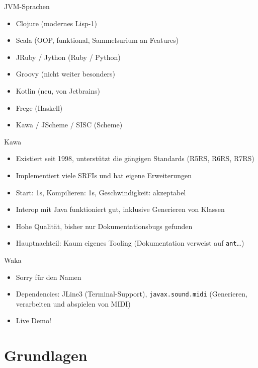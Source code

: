 \documentclass[presentation]{beamer}
\begin{document}
\begin{frame}[label=sec-1-7]{JVM-Sprachen}
\begin{itemize}
\item Clojure (modernes Lisp-1)
\item Scala (OOP, funktional, Sammelsurium an Features)
\item JRuby / Jython (Ruby / Python)
\item Groovy (nicht weiter besonders)
\item Kotlin (neu, von Jetbrains)
\item Frege (Haskell)
\item Kawa / JScheme / SISC (Scheme)
\end{itemize}
\end{frame}

\begin{frame}[fragile,label=sec-1-8]{Kawa}
 \begin{itemize}
\item Existiert seit 1998, unterstützt die gängigen Standards (R5RS, R6RS,
R7RS)
\item Implementiert viele SRFIs und hat eigene Erweiterungen
\item Start: 1s, Kompilieren: 1s, Geschwindigkeit: akzeptabel
\item Interop mit Java funktioniert gut, inklusive Generieren von Klassen
\item Hohe Qualität, bisher nur Dokumentationsbugs gefunden
\item Hauptnachteil: Kaum eigenes Tooling (Dokumentation verweist auf
\texttt{ant}\ldots{})
\end{itemize}
\end{frame}

\begin{frame}[fragile,label=sec-1-9]{Waka}
 \begin{itemize}
\item Sorry für den Namen
\item Dependencies: JLine3 (Terminal-Support), \texttt{javax.sound.midi}
  (Generieren, verarbeiten und abspielen von MIDI)
\item Live Demo!
\end{itemize}
\end{frame}

\section{Grundlagen}
\label{sec-2}
\end{document}
